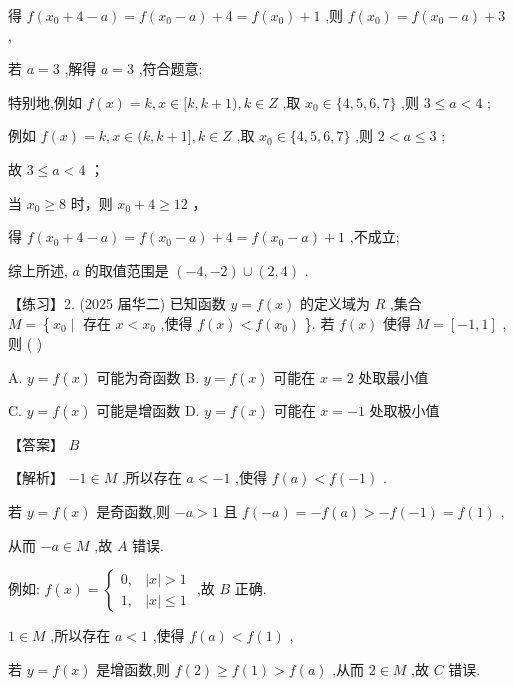 \documentclass[10pt]{article}
\begin{document}
得 \(f\left( {{x}_{0} + 4 - a}\right)  = f\left( {{x}_{0} - a}\right)  + 4 = f\left( {x}_{0}\right)  + 1\) ,则 \(f\left( {x}_{0}\right)  = f\left( {{x}_{0} - a}\right)  + 3\) ,

若 \(a = 3\) ,解得 \(a = 3\) ,符合题意;

特别地,例如 \(f\left( x\right)  = k,x \in  \lbrack k,k + 1),k \in  Z\) ,取 \({x}_{0} \in  \{ 4,5,6,7\}\) ,则 \(3 \leq  a < 4\) ;

例如 \(f\left( x\right)  = k,x \in  (k,k + 1\rbrack ,k \in  Z\) ,取 \({x}_{0} \in  \{ 4,5,6,7\}\) ,则 \(2 < a \leq  3\) ;

故 \(3 \leq  a < 4\) ；

当 \({x}_{0} \geq  8\) 时，则 \({x}_{0} + 4 \geq  {12}\) ，

得 \(f\left( {{x}_{0} + 4 - a}\right)  = f\left( {{x}_{0} - a}\right)  + 4 = f\left( {{x}_{0} - a}\right)  + 1\) ,不成立;

综上所述, \(a\) 的取值范围是 \(\left( {-4, - 2}\right)  \cup  \left( {2,4}\right)\) .

【练习】2. (2025 届华二) 已知函数 \(y = f\left( x\right)\) 的定义域为 \(R\) ,集合 \(M = \left\{  {{x}_{0} \mid  \text{ 存在 }x < {x}_{0}}\right.\) ,使得 \(f\left( x\right)  < f\left( {x}_{0}\right)\) \}. 若 \(f\left( x\right)\) 使得 \(M = \left\lbrack  {-1,1}\right\rbrack\) ,则 ( )

A. \(y = f\left( x\right)\) 可能为奇函数 B. \(y = f\left( x\right)\) 可能在 \(x = 2\) 处取最小值

C. \(y = f\left( x\right)\) 可能是增函数 D. \(y = f\left( x\right)\) 可能在 \(x =  - 1\) 处取极小值

【答案】 \(B\)

【解析】 \(- 1 \in  M\) ,所以存在 \(a <  - 1\) ,使得 \(f\left( a\right)  < f\left( {-1}\right)\) .

若 \(y = f\left( x\right)\) 是奇函数,则 \(- a > 1\) 且 \(f\left( {-a}\right)  =  - f\left( a\right)  >  - f\left( {-1}\right)  = f\left( 1\right)\) ,

从而 \(- a \in  M\) ,故 \(A\) 错误.

例如: \(f\left( x\right)  = \left\{  \begin{array}{ll} 0, & \left| x\right|  > 1 \\  1, & \left| x\right|  \leq  1 \end{array}\right.\) ,故 \(B\) 正确.

\(1 \in  M\) ,所以存在 \(a < 1\) ,使得 \(f\left( a\right)  < f\left( 1\right)\) ,

若 \(y = f\left( x\right)\) 是增函数,则 \(f\left( 2\right)  \geq  f\left( 1\right)  > f\left( a\right)\) ,从而 \(2 \in  M\) ,故 \(C\) 错误.
\end{document}

